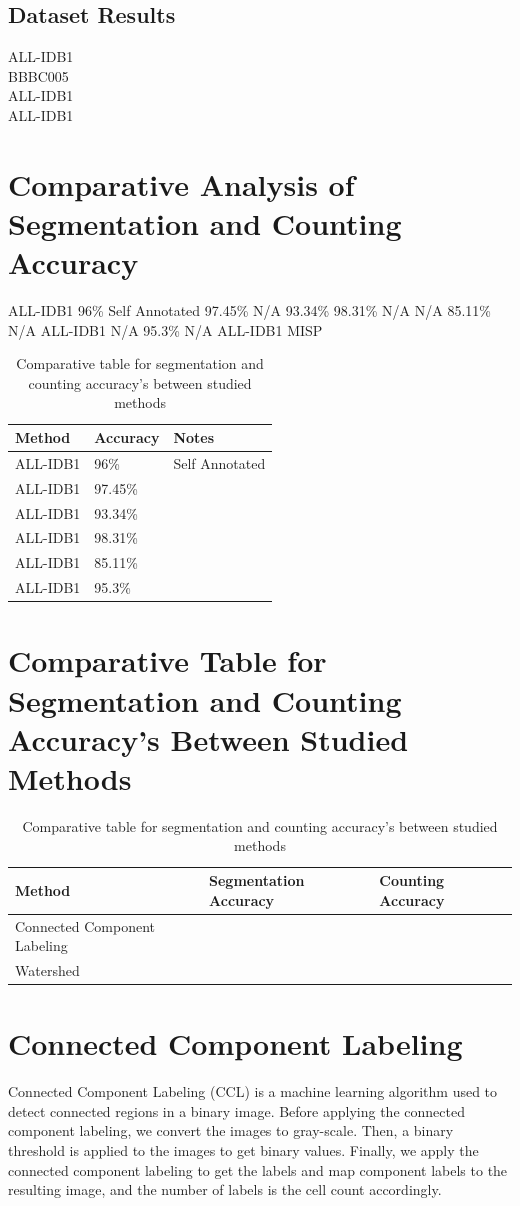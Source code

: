 \documentclass[conference]{IEEEtran}
\begin{document}
\subsection{Dataset Results}
ALL-IDB1 \\
BBBC005 \\
ALL-IDB1 \\
ALL-IDB1

\section{Comparative Analysis of Segmentation and Counting Accuracy}
ALL-IDB1
96\%
Self Annotated
97.45\%
N/A
93.34\%
98.31\%
N/A
N/A
85.11\%
N/A
ALL-IDB1
N/A
95.3\%
N/A
ALL-IDB1
MISP
\begin{table}[htbp]
\centering
\caption{Comparative table for segmentation and counting accuracy's between studied methods}
\label{tab:ComparativeTable}
\begin{tabular}{lll}
\hline
Method & Accuracy & Notes \\
\hline
ALL-IDB1 & 96\% & Self Annotated \\
ALL-IDB1 & 97.45\% & \\
ALL-IDB1 & 93.34\% & \\
ALL-IDB1 & 98.31\% & \\
ALL-IDB1 & 85.11\% & \\
ALL-IDB1 & 95.3\% & \\
\hline
\end{tabular}
\end{table}

\section{Comparative Table for Segmentation and Counting Accuracy's Between Studied Methods}
\begin{table}[htbp]
\centering
\caption{Comparative table for segmentation and counting accuracy's between studied methods}
\label{tab:comparative_table}
\begin{tabular}{lll}
\hline
Method & Segmentation Accuracy & Counting Accuracy \\
\hline
Connected Component Labeling & & \\
Watershed & & \\
\hline
\end{tabular}
\end{table}
\section{Connected Component Labeling}
Connected Component Labeling (CCL) is a machine learning algorithm used to detect connected regions in a binary image. Before applying the connected component labeling, we convert the images to gray-scale. Then, a binary threshold is applied to the images to get binary values. Finally, we apply the connected component labeling to get the labels and map component labels to the resulting image, and the number of labels is the cell count accordingly.
\end{document}

